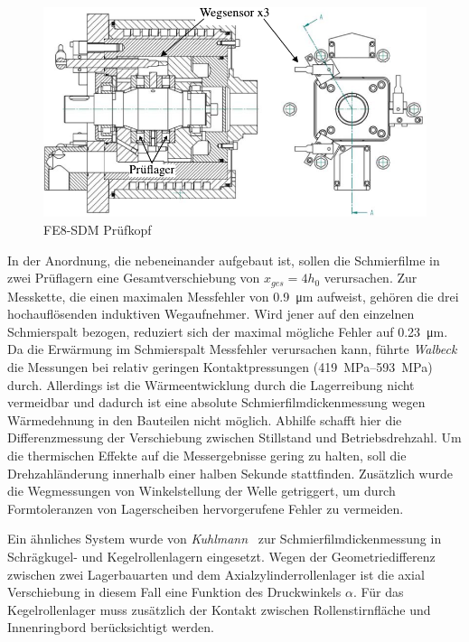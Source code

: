 \begin{figure}[htb]
    \centering
    \includegraphics[]{./images/fe8_sdm_walbeck.pdf}
    \caption{FE8-SDM Prüfkopf~\cite{Walbeck_2004}}
    \label{fig:fe8_sdm_walbeck}
\end{figure}

In der Anordnung, die nebeneinander aufgebaut ist, sollen die Schmierfilme in zwei Prüflagern eine Gesamtverschiebung von $x_{ges} = 4  h_0$ verursachen.
Zur Messkette, die einen maximalen Messfehler von \SI{0,9}{\micro\meter} aufweist, gehören die drei hochauflösenden induktiven Wegaufnehmer.
Wird jener auf den einzelnen Schmierspalt bezogen, reduziert sich der maximal mögliche Fehler auf \SI{0,23}{\micro\meter}.
Da die Erwärmung im Schmierspalt Messfehler verursachen kann, führte \textit{Walbeck} die Messungen bei relativ geringen Kontaktpressungen (\SIrange{419}{593}{\mega\pascal}) durch.
Allerdings ist die Wärmeentwicklung durch die Lagerreibung nicht vermeidbar und dadurch ist eine absolute Schmierfilmdickenmessung wegen Wärmedehnung in den Bauteilen nicht möglich.
Abhilfe schafft hier die Differenzmessung der Verschiebung zwischen Stillstand und Betriebsdrehzahl.
Um die thermischen Effekte auf die Messergebnisse gering zu halten, soll die Drehzahländerung innerhalb einer halben Sekunde stattfinden.
Zusätzlich wurde die Wegmessungen von Winkelstellung der Welle getriggert, um durch Formtoleranzen von Lagerscheiben hervorgerufene Fehler zu vermeiden.

Ein ähnliches System wurde von \textit{Kuhlmann}~\cite{kuhlmann_2009} zur Schmierfilmdickenmessung in Schrägkugel- und Kegelrollenlagern eingesetzt.
Wegen der Geometriedifferenz zwischen zwei Lagerbauarten und dem Axialzylinderrollenlager ist die axial Verschiebung in diesem Fall eine Funktion des Druckwinkels $\alpha$.
Für das Kegelrollenlager muss zusätzlich der Kontakt zwischen Rollenstirnfläche und Innenringbord berücksichtigt werden.


